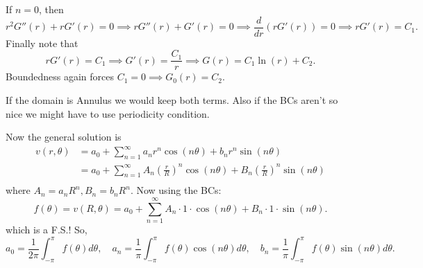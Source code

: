 \documentclass[class=article,crop=false]{standalone}
\begin{document}
\begin{eg}
If $ n=0$, then
 \[
	 r^2G''(r)+rG'(r)=0 \implies rG''(r)+G'(r)=0 \implies \frac{d}{dr} (r G'(r))=0 \implies rG'(r)=C_1
.\] 
Finally note that 
\[
	rG'(r)=C_1 \implies G'(r)=\frac{C_1}{r} \implies G(r)=C_1 \ln(r)+ C_2
.\] 
Boundedness again forces $ C_1 =0 \implies G_0(r)=C_2$.

\begin{note}[]
If the domain is Annulus we would keep both terms. Also if the BCs aren't so nice we might have to use periodicity condition.
\end{note}

Now the general solution is
\begin{align*}
	v(r,\theta) &= a_0 + \sum_{ n= 1}^{\infty} a_n r^{n} \cos(n \theta ) + b_n r^{n} \sin(n \theta )\\
		    &= a_0 + \sum_{ n= 1}^{\infty} A_n \left( \frac{r}{R} \right)^{n} \cos(n\theta  ) + B_n \left( \frac{r}{R}\right) ^{n} \sin(n \theta )   \\
\end{align*}
where $ A_n = a_n R^{n}, B_n = b_n R^{n}$. 
Now using the BCs:
\[
	f(\theta) = v(R,\theta)= a_0 + \sum_{ n= 1}^{\infty} A_n \cdot 1 \cdot \cos(n \theta)+ B_n \cdot 1 \cdot \sin(n \theta ) 
.\] 
which is a F.S.! So,
\[
	a_0 = \frac{1}{2\pi} \int_{-\pi}^{\pi} f(\theta) d\theta  , \quad  a_n =\frac{1}{\pi} \int_{-\pi}^{\pi} f(\theta) \cos(n \theta ) d\theta, \quad  b_n=\frac{1}{\pi} \int_{-\pi}^{\pi} f(\theta) \sin(n\theta ) d\theta   
.\] 
\end{eg}
\end{document}
